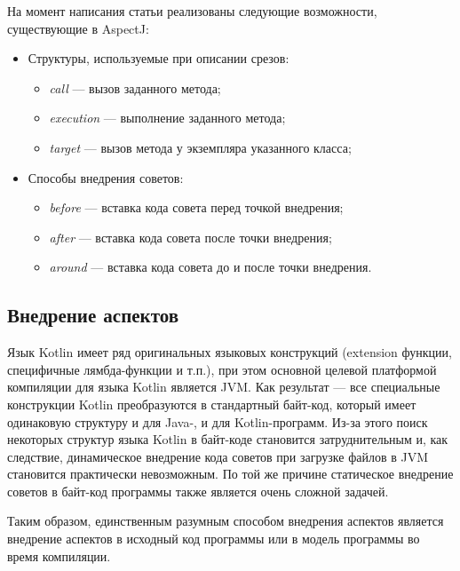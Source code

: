 \documentclass[conference]{IEEEtran}
\begin{document}
На момент написания статьи реализованы следующие возможности, существующие в
AspectJ:
\begin{itemize}
    \item Структуры, используемые при описании срезов:
        \begin{itemize}
            \item \textit{call} --- вызов заданного метода;
            \item \textit{execution} --- выполнение заданного метода;
            \item \textit{target} --- вызов метода у экземпляра указанного
              класса;
        \end{itemize}
    \item Способы внедрения советов:
        \begin{itemize}
            \item \textit{before} --- вставка кода совета перед точкой
                внедрения;
            \item \textit{after} --- вставка кода совета после точки внедрения;
            \item \textit{around} --- вставка кода совета до и после точки
                внедрения.
        \end{itemize}
\end{itemize}

\subsection{Внедрение аспектов}

Язык Kotlin имеет ряд оригинальных языковых конструкций (extension функции,
специфичные лямбда-функции и т.п.), при этом основной целевой платформой
компиляции для языка Kotlin является JVM.
Как результат --- все специальные конструкции Kotlin преобразуются в стандартный
байт-код, который имеет одинаковую структуру и для Java-, и для Kotlin-программ.
Из-за этого поиск некоторых структур языка Kotlin в байт-коде становится
затруднительным и, как следствие, динамическое внедрение кода советов при
загрузке файлов в JVM становится практически невозможным.
По той же причине статическое внедрение советов в байт-код программы также
является очень сложной задачей.

Таким образом, единственным разумным способом внедрения аспектов является
внедрение аспектов в исходный код программы или в модель программы во время
компиляции. 
\end{document}
